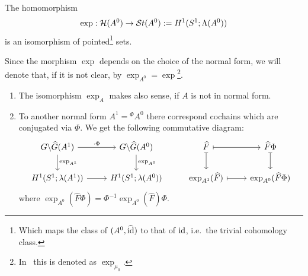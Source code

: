 \begin{tthm} \label{thm:mainThm1}
  The homomorphism
  \[
    \exp:\mathcal{H}(A^0)\to\mathcal{S}{}t(A^0):=H^1(S^1;\Lambda(A^0))
  \]
  is an isomorphism of pointed\footnote{Which maps the class of
  $(A^0,\widehat{\operatorname{id}})$ to that of $\operatorname{id}$, i.e.\ the trivial cohomology class.} sets.
\end{tthm}
\begin{rem}\label{rem:expNonNormalForm}
  \begin{s-defn}
    Since the morphism $\exp$ depends on the choice of the normal form, we will
    denote that, if it is not clear, by
    $\exp_{A^0}=\exp$\footnote{In~\cite{Loday1994} this is denoted as
    $\exp_{\mu_0}$.}.
  \end{s-defn}
  \begin{enumerate}
    \item {}
      The isomorphism $\exp_A$ makes also sense, if $A$ is not in normal form.
    \item {}
      To another normal form $A^1={}^\Phi\!A^0$ there correspond cochains which
      are conjugated via $\Phi$.
      We get the following commutative diagram:
      \[ \begin{tikzcd}
          G\backslash\hat G(A^1) \rar{\cdot\Phi}\dar{\exp_{A^1}}
          & G\backslash\hat G(A^0) \dar{\exp_{A^0}}
          & \hat F \arrow[|->]{r}\arrow[|->]{d}
          & \hat F\Phi \arrow[|->]{d}
        \\ H^1(S^1;\lambda(A^1)) \rar
          & H^1(S^1;\lambda(A^0))
          & \exp_{A^1}(\hat F) \arrow[|->]{r}
          & \exp_{A^0}(\hat F\Phi)
      \end{tikzcd} \]
      where $\exp_{A^0}(\hat F\Phi)=\Phi^{-1}\exp_{A^0}(\hat F)\Phi$.
      \TODO[$\Phi\in G(\!(t)\!)$???]
  \end{enumerate}
\end{rem}

